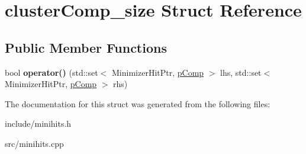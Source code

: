 \hypertarget{structclusterComp__size}{}\section{cluster\+Comp\+\_\+size Struct Reference}
\label{structclusterComp__size}
\subsection*{Public Member Functions}
\begin{DoxyCompactItemize}
\item 
\mbox{\label{structclusterComp__size_aa07f27c2b345352650adebabcd7ef9e8}} 
bool {\bfseries operator()} (std\+::set$<$ Minimizer\+Hit\+Ptr, \hyperlink{structpComp}{p\+Comp} $>$ lhs, std\+::set$<$ Minimizer\+Hit\+Ptr, \hyperlink{structpComp}{p\+Comp} $>$ rhs)
\end{DoxyCompactItemize}


The documentation for this struct was generated from the following files\+:\begin{DoxyCompactItemize}
\item 
include/minihits.\+h\item 
src/minihits.\+cpp\end{DoxyCompactItemize}
